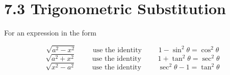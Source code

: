 %
%

\section*{7.3 Trigonometric Substitution}

For an expression in the form 

\[ \sqrt{a^2-x^2} \quad \quad \text{ use the identity }  \quad \quad 1-\sin^2{\theta} = \cos^2{\theta} \]
\[ \sqrt{a^2+x^2} \quad \quad \text{ use the identity }  \quad \quad 1+\tan^2{\theta} = \sec^2{\theta} \]
\[ \sqrt{x^2-a^2} \quad \quad \text{ use the identity }  \quad \quad \sec^2{\theta} - 1 = \tan^2{\theta} \]
